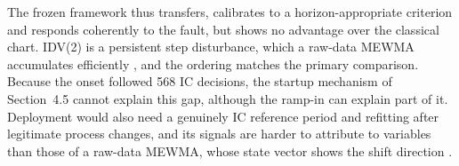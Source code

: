 The frozen framework thus transfers, calibrates to a horizon-appropriate criterion and responds coherently to the fault, but shows no advantage over the classical chart. IDV(2) is a persistent step disturbance, which a raw-data MEWMA accumulates
efficiently \citep{lowry_multivariate_1992}, and the ordering matches the primary comparison.
Because the onset followed 568 IC decisions, the startup mechanism of Section~4.5 cannot
explain this gap, although the ramp-in can explain part of it. Deployment would also need a genuinely IC reference period and refitting after legitimate process changes, and its signals are harder to attribute to variables than those of a raw-data MEWMA, whose state vector shows the shift direction \citep{lowry_multivariate_1992}.
